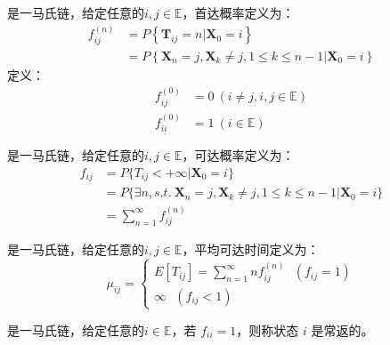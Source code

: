         \begin{definition}[首达概率]
            \MarkovChain 是一马氏链，给定任意的$i, j \in \mathbb{E}$，首达概率定义为：
            \begin{align*}
                f_{ij}^{(n)} &= P\left\{ \textbf{T}_{ij} = n | \textbf{X}_0 = i \right\} \\
                &= P\left\{ \textbf{X}_n = j, \textbf{X}_k \neq j, 1 \leq k \leq n - 1 | \textbf{X}_0 = i \right\} 
            \end{align*}
            定义：
            \begin{align*}
                f_{ij}^{(0)} &= 0\ (i \neq j, i, j \in \mathbb{E}) \\
                f_{ii}^{(0)} &= 1\ ( i \in \mathbb{E})
            \end{align*} 
        \end{definition}

        \begin{definition}[可达概率]
            \MarkovChain 是一马氏链，给定任意的$i, j \in \mathbb{E}$，可达概率定义为：
            \begin{align*}
                f_{ij} &= P\{T_{ij} < +\infty | \textbf{X}_0 = i\} \\
                &= P\{\exists n, s.t.\ \textbf{X}_n = j, \textbf{X}_k \neq j, 1 \leq k \leq n - 1 | \textbf{X}_0 = i\} \\
                &= \sum\limits_{n = 1}^{\infty} f_{ij}^{(n)}
            \end{align*}
        \end{definition}

        \begin{definition}[平均可达时间]
            \MarkovChain 是一马氏链，给定任意的$i, j \in \mathbb{E}$，平均可达时间定义为：
            \[
                \mu_{ij} =
                \left\{
                    \begin{array}{l}
                        E\left[ T_{ij} \right] = \sum\limits_{n=1}^{\infty} n f_{ij}^{(n)}\ \ \ (f_{ij} = 1) \\
                        \infty\ \ \ (f_{ij} < 1)
                    \end{array}
                \right. 
            \] 
        \end{definition}

        \begin{definition}[常返]
            \MarkovChain 是一马氏链，给定任意的$i \in \mathbb{E}$，若 $f_{ii} = 1$，则称状态 $i$ 是常返的。
        \end{definition}        

